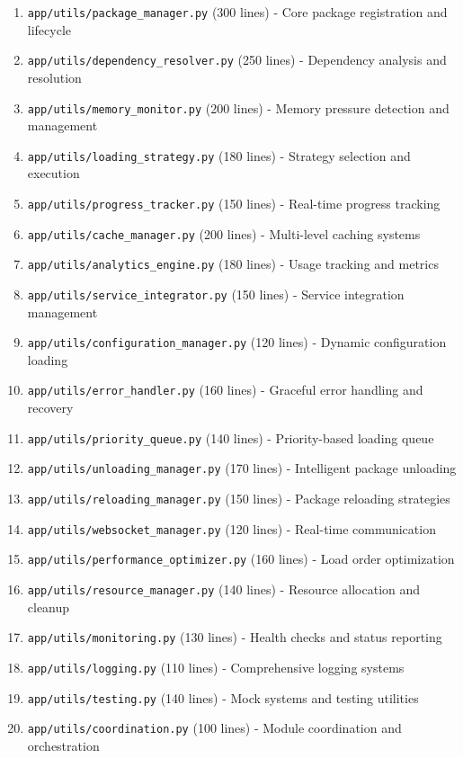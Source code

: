 \documentclass[11pt]{article}
\begin{document}
\begin{enumerate}
\item \texttt{app/utils/package\_manager.py} (300 lines) - Core package registration and lifecycle
\item \texttt{app/utils/dependency\_resolver.py} (250 lines) - Dependency analysis and resolution
\item \texttt{app/utils/memory\_monitor.py} (200 lines) - Memory pressure detection and management
\item \texttt{app/utils/loading\_strategy.py} (180 lines) - Strategy selection and execution
\item \texttt{app/utils/progress\_tracker.py} (150 lines) - Real-time progress tracking
\item \texttt{app/utils/cache\_manager.py} (200 lines) - Multi-level caching systems
\item \texttt{app/utils/analytics\_engine.py} (180 lines) - Usage tracking and metrics
\item \texttt{app/utils/service\_integrator.py} (150 lines) - Service integration management
\item \texttt{app/utils/configuration\_manager.py} (120 lines) - Dynamic configuration loading
\item \texttt{app/utils/error\_handler.py} (160 lines) - Graceful error handling and recovery
\item \texttt{app/utils/priority\_queue.py} (140 lines) - Priority-based loading queue
\item \texttt{app/utils/unloading\_manager.py} (170 lines) - Intelligent package unloading
\item \texttt{app/utils/reloading\_manager.py} (150 lines) - Package reloading strategies
\item \texttt{app/utils/websocket\_manager.py} (120 lines) - Real-time communication
\item \texttt{app/utils/performance\_optimizer.py} (160 lines) - Load order optimization
\item \texttt{app/utils/resource\_manager.py} (140 lines) - Resource allocation and cleanup
\item \texttt{app/utils/monitoring.py} (130 lines) - Health checks and status reporting
\item \texttt{app/utils/logging.py} (110 lines) - Comprehensive logging systems
\item \texttt{app/utils/testing.py} (140 lines) - Mock systems and testing utilities
\item \texttt{app/utils/coordination.py} (100 lines) - Module coordination and orchestration
\end{enumerate}
\end{document}
